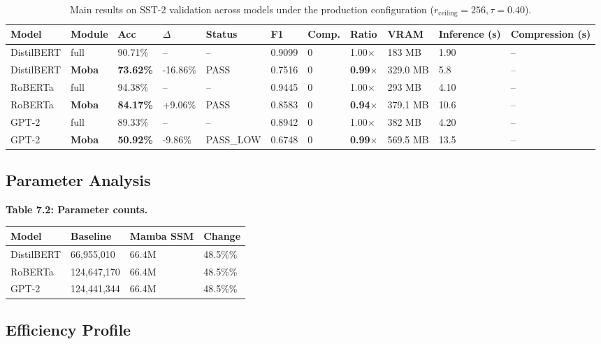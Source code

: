 \begin{table}[t]
\centering
\small
\begin{tabular}{lllllllllll}
\toprule
\textbf{Model} & \textbf{Module} & \textbf{Acc} & \textbf{$\Delta$} & \textbf{Status} & \textbf{F1} & \textbf{Comp.} & \textbf{Ratio} & \textbf{VRAM} & \textbf{Inference (s)} & \textbf{Compression (s)} \\
\midrule
DistilBERT & full & 90.71\% & -- & -- & 0.9099 & 0 & 1.00$\times$ & 183 MB & 1.90 & -- \\
DistilBERT & \textbf{Moba} & \textbf{73.62\%} & -16.86\% & PASS & 0.7516 & 0 & \textbf{0.99$\times$} & 329.0 MB & 5.8 & -- \\
RoBERTa & full & 94.38\% & -- & -- & 0.9445 & 0 & 1.00$\times$ & 293 MB & 4.10 & -- \\
RoBERTa & \textbf{Moba} & \textbf{84.17\%} & +9.06\% & PASS & 0.8583 & 0 & \textbf{0.94$\times$} & 379.1 MB & 10.6 & -- \\
GPT-2 & full & 89.33\% & -- & -- & 0.8942 & 0 & 1.00$\times$ & 382 MB & 4.20 & -- \\
GPT-2 & \textbf{Moba} & \textbf{50.92\%} & -9.86\% & PASS\_LOW & 0.6748 & 0 & \textbf{0.99$\times$} & 569.5 MB & 13.5 & -- \\
\bottomrule
\end{tabular}
\caption{Main results on SST-2 validation across models under the production configuration ($r_{\mathrm{ceiling}}=256, \tau=0.40$).}
\label{tab:main_sst2}
\end{table}

\subsection{Parameter Analysis}

\textbf{Table 7.2: Parameter counts.}

\begin{table}[H]
\centering
\small
\begin{tabular}{llll}
\toprule
\textbf{Model} & \textbf{Baseline} & \textbf{Mamba SSM} & \textbf{Change} \\
\midrule
DistilBERT & 66,955,010 & 66.4M & 48.5\%\% \\
RoBERTa & 124,647,170 & 66.4M & 48.5\%\% \\
GPT-2 & 124,441,344 & 66.4M & 48.5\%\% \\
\bottomrule
\end{tabular}
\end{table}

\subsection{Efficiency Profile}

